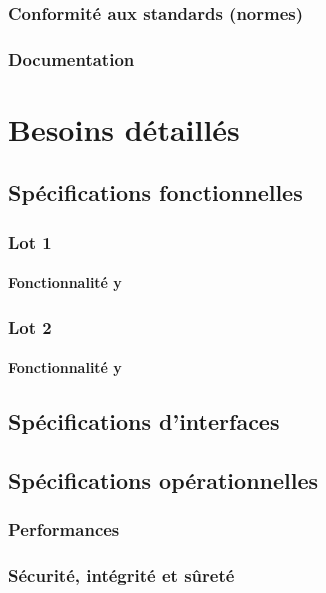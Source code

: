\documentclass[asi]{picINSA}
\begin{document}
\subsection{Conformité aux standards (normes)}

\subsection{Documentation}

\chapter{Besoins détaillés}

\section{Spécifications fonctionnelles}

\subsection{Lot 1}

\subsubsection{Fonctionnalité y}

\subsection{Lot 2}

\subsubsection{Fonctionnalité y}

\section{Spécifications d'interfaces}

\section{Spécifications opérationnelles}

\subsection{Performances}

\subsection{Sécurité, intégrité et sûreté}
\end{document}

